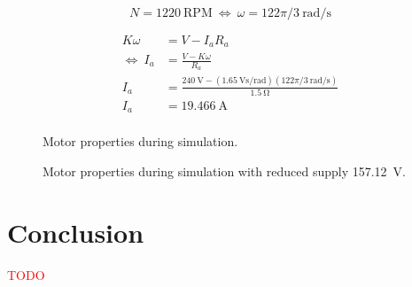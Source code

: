 \documentclass[a4paper,10pt]{article}
\newcommand{\V}{\si{\volt}\xspace}
\newcommand{\A}{\si{\ampere}\xspace}
\newcommand{\Ohm}{\si{\ohm}\xspace}
\newcommand{\rps}{\si{\radian\per\second}\xspace}
\newcommand{\Vspr}{\si{\volt\second\per\radian}\xspace}
\newcommand{\RPM}{\text{RPM}\xspace}
\begin{document}
\begin{equation*}
    N = 1220~\RPM~\Leftrightarrow~\omega = 122\pi/3~\rps
\end{equation*}

\begin{align*}
    K \omega &= V - I_a R_a \\
    \Leftrightarrow~ I_a &= \frac{V - K \omega}{R_a} \\
    I_a &= \frac{240~\V - (1.65~\Vspr)(122\pi/3~\rps)}{1.5~\Ohm} \\
    I_a &= 19.466~\A \\
\end{align*}


\begin{figure}[h]
    \centering
    \def\svgwidth{\textwidth}
    
    \caption{Motor properties during simulation.}
    \label{fig:Results240V}
\end{figure}

\begin{figure}[h]
    \centering
    \def\svgwidth{\textwidth}
    
    \caption{Motor properties during simulation with reduced supply 157.12~\V.}
    \label{fig:Results157V}
\end{figure}

\section{Conclusion}

\textcolor{red}{TODO}

\printbibliography[category=cited]
\printbibliography[
    notcategory=cited,omitnumbers=true,title={Bibliography}
]



\clearpage

\end{document}

